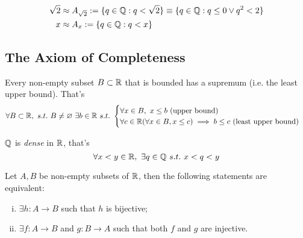 \documentclass[11pt]{article}
\begin{document}
        \begin{example}
            \begin{align}
                \sqrt{2} &\approx A_{\sqrt{2}} := \{q \in \mathbb{Q}: q < \sqrt{2}\} \equiv \{q \in \mathbb{Q}: q \leq 0 \lor q^2 < 2\} \\
                x &\approx A_x := \{q \in \mathbb{Q}: q < x\}
            \end{align}
        \end{example}
        
        \subsection{The Axiom of Completeness}
            \begin{axiom}
                Every non-empty subset $B \subset \mathbb{R}$ that is bounded has a supremum (i.e. the least upper bound). That's
                \begin{equation}
                    \forall B \subset \R,\ s.t.\ B \neq \varnothing\ \exists b \in \R\ s.t.\ 
                    \begin{cases}
                        \forall x \in B,\ x \leq b \tx{ (upper bound)} \\
                        \forall c \in \R (\forall x \in B, x \leq c) \implies b \leq c \tx{ (least upper bound)}
                    \end{cases}
                \end{equation}
            \end{axiom}
            
            \begin{theorem}
                $\mathbb{Q}$ is \emph{dense} in $\mathbb{R}$, that's
                \begin{equation}
                    \forall x < y \in \R,\ \exists q \in \Q\ s.t.\ x < q < y
                \end{equation}
            \end{theorem}
            
            \begin{theorem}[Cardinality]
                Let $A, B$ be non-empty subsets of $\mathbb{R}$, then the following statements are equivalent:
                \begin{enumerate}[(i)]
                    \item $\exists h: A \to B$ such that $h$ is bijective;
                    \item $\exists f: A \to B$ and $g: B \to A$ such that both $f$ and $g$ are injective.
                \end{enumerate}
            \end{theorem}
            
\end{document}
